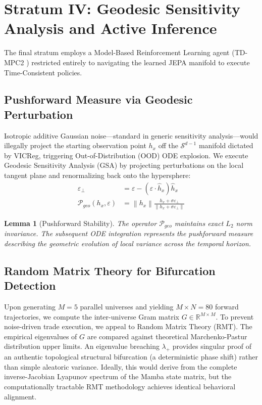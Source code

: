 \documentclass[11pt]{article}
\newtheorem{lemma}[theorem]{Lemma}
\newcommand{\EPS}{\varepsilon}
\newcommand{\R}{\mathbb{R}}
\newcommand{\norm}[1]{\left\|#1\right\|}
\begin{document}
\section{Stratum IV: Geodesic Sensitivity Analysis and Active Inference}

The final stratum employs a Model-Based Reinforcement Learning agent (TD-MPC2 \cite{hansen2024tdmpc2}) restricted entirely to navigating the learned JEPA manifold to execute Time-Consistent policies.

\subsection{Pushforward Measure via Geodesic Perturbation}
Isotropic additive Gaussian noise—standard in generic sensitivity analysis—would illegally project the starting observation point $h_x$ off the $\mathcal{S}^{d-1}$ manifold dictated by VICReg, triggering Out-of-Distribution (OOD) ODE explosion.
We execute Geodesic Sensitivity Analysis (GSA) by projecting perturbations on the local tangent plane and renormalizing back onto the hypersphere:
\begin{align}
  \EPS_\perp &= \EPS - (\EPS \cdot \hat{h}_x) \hat{h}_x \nonumber \\
  \mathcal{P}_{geo}(h_x, \EPS) &= \norm{h_x} \frac{h_x + \sigma \EPS_\perp}{\norm{h_x + \sigma \EPS_\perp}}
\end{align}
\begin{lemma}[Pushforward Stability]
The operator $\mathcal{P}_{geo}$ maintains exact $L_2$ norm invariance. The subsequent ODE integration represents the pushforward measure describing the geometric evolution of local variance across the temporal horizon.
\end{lemma}

\subsection{Random Matrix Theory for Bifurcation Detection}
Upon generating $M=5$ parallel universes and yielding $M \times N = 80$ forward trajectories, we compute the inter-universe Gram matrix $G \in \R^{M \times M}$. 
To prevent noise-driven trade execution, we appeal to Random Matrix Theory (RMT). The empirical eigenvalues of $G$ are compared against theoretical Marchenko-Pastur distribution upper limits. An eigenvalue breaching $\lambda_+$ provides singular proof of an authentic topological structural bifurcation (a deterministic phase shift) rather than simple aleatoric variance. Ideally, this would derive from the complete inverse-Jacobian Lyapunov spectrum of the Mamba state matrix, but the computationally tractable RMT methodology achieves identical behavioral alignment.
\end{document}
